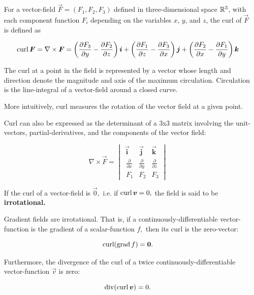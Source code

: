 \documentclass{article}
\begin{document}
\begin{definition}[Curl]
For a \@{vector-field} $\vec{F} = (F_1, F_2, F_3)$ defined in three-dimensional space $\mathbb{R}^3$, with each \@{component} function $F_i$ depending on the variables $x$, $y$, and $z$, the curl of $\vec{F}$ is defined as

\[ \operatorname{curl} \boldsymbol{F} = \nabla \times \boldsymbol{F} = \left(\frac{\partial F_3}{\partial y} - \frac{\partial F_2}{\partial z}\right) \mathbf{\boldsymbol{i}} + \left(\frac{\partial F_1}{\partial z} - \frac{\partial F_3}{\partial x}\right) \mathbf{\boldsymbol{j}} + \left(\frac{\partial F_2}{\partial x} - \frac{\partial F_1}{\partial y}\right) \mathbf{\boldsymbol{k}} \]
\end{definition}

\begin{remark}
The \@{curl} at a point in the field is represented by a \@{vector} whose \@{length} and \@{direction} denote the \@{magnitude} and axis of the maximum circulation. Circulation is the \@{line-integral} of a \@{vector-field} around a closed curve.

More intuitively, curl measures the rotation of the vector field at a given point.

Curl can also be expressed as the determinant of a 3x3 matrix involving the \@{unit-vectors}, \@{partial-derivatives}, and the \@{components} of the vector field:

\[ \nabla \times \vec{F} = \begin{vmatrix} \mathbf{\vec{i}} & \mathbf{\vec{j}} & \mathbf{\vec{k}}  \\\ \frac{\partial}{\partial x} & \frac{\partial}{\partial y} & \frac{\partial}{\partial z} \\\ F_1 & F_2 & F_3  \end{vmatrix} \]
\end{remark}

\begin{definition}[Irrotational]
If the \@{curl} of a \@{vector-field} is $\vec{0},$ i.e. if $\operatorname{curl}{\boldsymbol{v}} = 0,$ the field is said to be \textbf{irrotational.}
\end{definition}

\begin{theorem}\label{grad-div-curl-related}
Gradient fields are \@{irrotational}. That is, if a \@{continuously-differentiable} \@{vector-function} is the \@{gradient} of a \@{scalar-function} $f,$ then its \@{curl} is the \@{zero-vector}:

\[ \operatorname{curl}(\operatorname{grad}{f}) = \boldsymbol{0}. \]

Furthermore, the \@{divergence} of the \@{curl} of a twice \@{continuously-differentiable} \@{vector-function} $\vec{v}$ is zero:

\[ \operatorname{div}(\operatorname{curl}{\boldsymbol{v}}) = 0. \]
\end{theorem}
\end{document}
